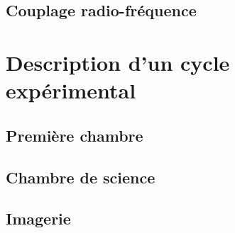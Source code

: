 \subsection{Couplage radio-fréquence} 

\section{Description d'un cycle expérimental}
\subsection{Première chambre}
\subsection{Chambre de science}
\subsection{Imagerie}

